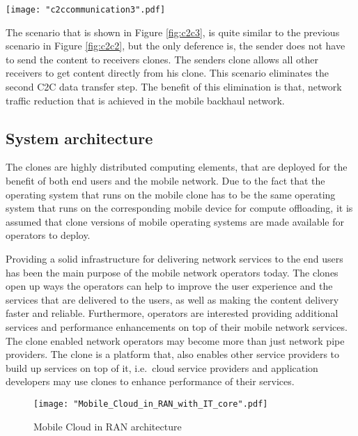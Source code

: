 \documentclass[12pt,journal,compsoc, onecolumn]{IEEEtran}
\begin{document}
\begin{figure*}[ht]
\centering
\texttt{[image: "c2ccommunication3".pdf]}
\caption{\label{fig:c2c3} C2C: One sender - many receives same content from the senders's clone directly.}
\end{figure*} 

The scenario that is shown in Figure \ref{fig:c2c3}, is quite similar to the previous scenario in Figure \ref{fig:c2c2}, but the only deference is, the sender does not have to send the content to receivers clones. The senders clone allows all other receivers to get content directly from his clone. This scenario eliminates the second C2C data transfer step. The benefit of this elimination is that, network traffic reduction that is achieved in the mobile backhaul network.

\subsection{System architecture}
\label{sec:mcarch}

The clones are highly distributed computing elements, that are deployed for the benefit of both end users and the mobile network. Due to the fact that the operating system that runs on the mobile clone has to be the same operating system that runs on the corresponding mobile device for compute offloading, it is assumed that clone versions of mobile operating systems are made available for operators to deploy.

Providing a solid infrastructure for delivering network services to the end users has been the main purpose of the mobile network operators today. The clones open up ways the operators can help to improve the user experience and the services that are delivered to the users, as well as making the content delivery faster and reliable. Furthermore, operators are interested providing additional services and performance enhancements on top of their mobile network services. The clone enabled network operators may become more than just network pipe providers. The clone is a platform that, also enables other service providers to build up services on top of it, i.e.\ cloud service providers and application developers may use clones to enhance performance of their services.

\begin{figure}
\centering
\texttt{[image: "Mobile\_Cloud\_in\_RAN\_with\_IT\_core".pdf]}
\caption{\label{fig:mcarch} Mobile Cloud in RAN architecture}
\end{figure} 
\end{document}
